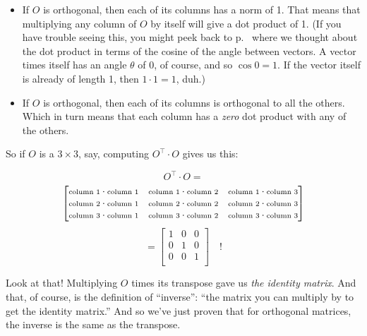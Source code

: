 \begin{itemize}
\itemsep.1em

\item If $O$ is orthogonal, then each of its columns has a norm of 1. That
means that multiplying any column of $O$ by itself will give a dot product of
1. (If you have trouble seeing this, you might peek back to
p.~\pageref{cosineDotProduct} where we thought about the dot product in terms
of the cosine of the angle between vectors. A vector times itself has an angle
$\theta$ of 0, of course, and so $\cos 0 = 1$. If the vector itself is already
of length 1, then $1 \cdot 1 = 1$, duh.)

\item If $O$ is orthogonal, then each of its columns is orthogonal to all the
others. Which in turn means that each column has a \textit{zero} dot product
with any of the others.

\end{itemize}

So if $O$ is a $3 \times 3$, say, computing $O^\intercal \cdot O$ gives us
this:

\vspace{-.35in}
\begin{center}
\[
O^\intercal \cdot O =
\]
\[
\begin{bmatrix}
\scriptsize
\textrm{column 1} \cdot \textrm{column 1} &
\scriptsize
\textrm{column 1} \cdot \textrm{column 2} &
\scriptsize
\textrm{column 1} \cdot \textrm{column 3} \\
\scriptsize
\textrm{column 2} \cdot \textrm{column 1} &
\scriptsize
\textrm{column 2} \cdot \textrm{column 2} &
\scriptsize
\textrm{column 2} \cdot \textrm{column 3} \\
\scriptsize
\textrm{column 3} \cdot \textrm{column 1} &
\scriptsize
\textrm{column 3} \cdot \textrm{column 2} &
\scriptsize
\textrm{column 3} \cdot \textrm{column 3} \\
\end{bmatrix}
\]
\[
= \begin{bmatrix}
1 & 0 & 0 \\
0 & 1 & 0 \\
0 & 0 & 1 \\
\end{bmatrix} \quad \textrm{!}
\]
\end{center}
\vspace{-.1in}


Look at that! Multiplying $O$ times its transpose gave us \textit{the identity
matrix}. And that, of course, is the definition of ``inverse'': ``the matrix
you can multiply by to get the identity matrix.'' And so we've just proven that
for orthogonal matrices, the inverse is the same as the transpose.

